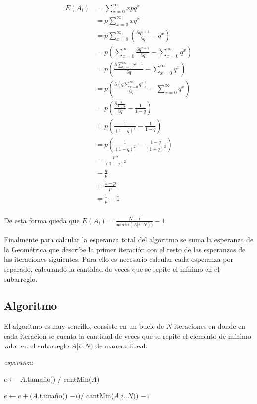 \[ \begin{aligned}
    E(A_i)  &= \sum_{x = 0}^{\infty}{x p q^x} \\
    		&= p \sum_{x = 0}^{\infty}{x q^x} \\
    		&= p \sum_{x = 0}^{\infty}{\left( \frac{\partial q^{x + 1}}{\partial q} - q^x \right)} \\
    		&= p \left( \sum_{x = 0}^{\infty}{\frac{\partial q^{x + 1}}{\partial q}} - \sum_{x = 0}^{\infty}{q^x} \right) \\
    		&= p \left( \frac{\partial \sum_{x = 0}^{\infty}{q^{x + 1}}}{\partial q} - \sum_{x = 0}^{\infty}{q^x} \right) \\
    		&= p \left( \frac{\partial (q \sum_{x = 0}^{\infty}{q^x})}{\partial q} - \sum_{x = 0}^{\infty}{q^x} \right) \\
    		&= p \left( \frac{\partial \frac{q}{1 - q}}{\partial q} - \frac{1}{1 - q} \right) \\
    		&= p \left( \frac{1}{(1 - q)^2} - \frac{1}{1 - q} \right) \\
    		&= p \left( \frac{1}{(1 - q)^2} - \frac{1 - q}{(1 - q)^2} \right) \\
    		&= \frac{pq}{(1 - q)^2} \\
    		&= \frac{q}{p} \\
    		&= \frac{1 - p}{p} \\
    		&= \frac{1}{p} - 1 \\
\end{aligned} \]

De esta forma queda que $E(A_i) = \frac{N - i}{\#min(A[i..N))} - 1$

Finalmente para calcular la esperanza total del algoritmo se suma la esperanza
de la Geométrica que describe la primer iteración con el resto de las
esperanzas de las iteraciones siguientes. Para ello es necesario calcular
cada esperanza por separado, calculando la cantidad de veces que se repite el
mínimo en el subarreglo.

\subsection{Algoritmo}

El algoritmo es muy sencillo, consiste en un bucle de $N$ iteraciones en
donde en cada iteracion se cuenta la cantidad de veces que se repite el
elemento de mínimo valor en el subarreglo $A[i..N)$ de manera lineal.

\bigskip

\begin{algorithm}[H]
	\caption{\textit{esperanza}}

	$e \gets$ $A$.tamaño() $/$ cantMin($A$) \;

     {
		$e \gets e + (A$.tamaño() $- i) /$ cantMin($A[i..N)$) $- 1$ \;
	}

\end{algorithm}

